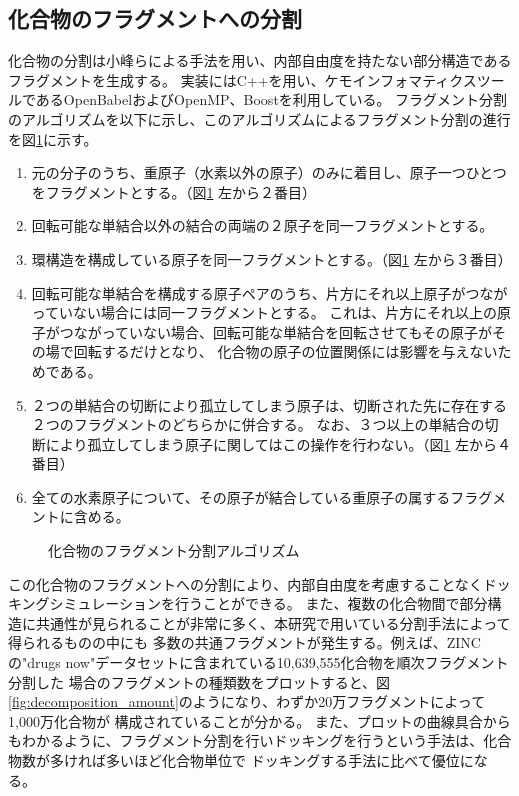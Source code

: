 \subsection{化合物のフラグメントへの分割}\label{subsec:decomposition}
化合物の分割は小峰らによる手法\cite{Shunta2015}を用い、内部自由度を持たない部分構造であるフラグメントを生成する。
実装にはC++を用い、ケモインフォマティクスツールであるOpenBabel\cite{OBoyle2011}およびOpenMP、Boostを利用している。
フラグメント分割のアルゴリズムを以下に示し、このアルゴリズムによるフラグメント分割の進行を図\ref{fig:decomposition}に示す。
\begin{enumerate} 
\item 元の分子のうち、重原子（水素以外の原子）のみに着目し、原子一つひとつをフラグメントとする。（図\ref{fig:decomposition} 左から２番目）
\item 回転可能な単結合以外の結合の両端の２原子を同一フラグメントとする。
\item 環構造を構成している原子を同一フラグメントとする。（図\ref{fig:decomposition} 左から３番目）
\item 回転可能な単結合を構成する原子ペアのうち、片方にそれ以上原子がつながっていない場合には同一フラグメントとする。
	これは、片方にそれ以上の原子がつながっていない場合、回転可能な単結合を回転させてもその原子がその場で回転するだけとなり、
	化合物の原子の位置関係には影響を与えないためである。
\item ２つの単結合の切断により孤立してしまう原子は、切断された先に存在する２つのフラグメントのどちらかに併合する。
	なお、３つ以上の単結合の切断により孤立してしまう原子に関してはこの操作を行わない。（図\ref{fig:decomposition} 左から４番目）
\item 全ての水素原子について、その原子が結合している重原子の属するフラグメントに含める。
\end{enumerate}

\begin{figure}[htp]
 \begin{center}
  \caption{化合物のフラグメント分割アルゴリズム\cite{Shunta2015}}
  \label{fig:decomposition}
 \end{center}
\end{figure}

この化合物のフラグメントへの分割により、内部自由度を考慮することなくドッキングシミュレーションを行うことができる。
また、複数の化合物間で部分構造に共通性が見られることが非常に多く、本研究で用いている分割手法によって得られるものの中にも
多数の共通フラグメントが発生する。例えば、ZINCの"drugs now"データセットに含まれている10,639,555化合物を順次フラグメント分割した
場合のフラグメントの種類数をプロットすると、図\ref{fig:decomposition_amount}のようになり、わずか20万フラグメントによって1,000万化合物が
構成されていることが分かる。
また、プロットの曲線具合からもわかるように、フラグメント分割を行いドッキングを行うという手法は、化合物数が多ければ多いほど化合物単位で
ドッキングする手法に比べて優位になる。

